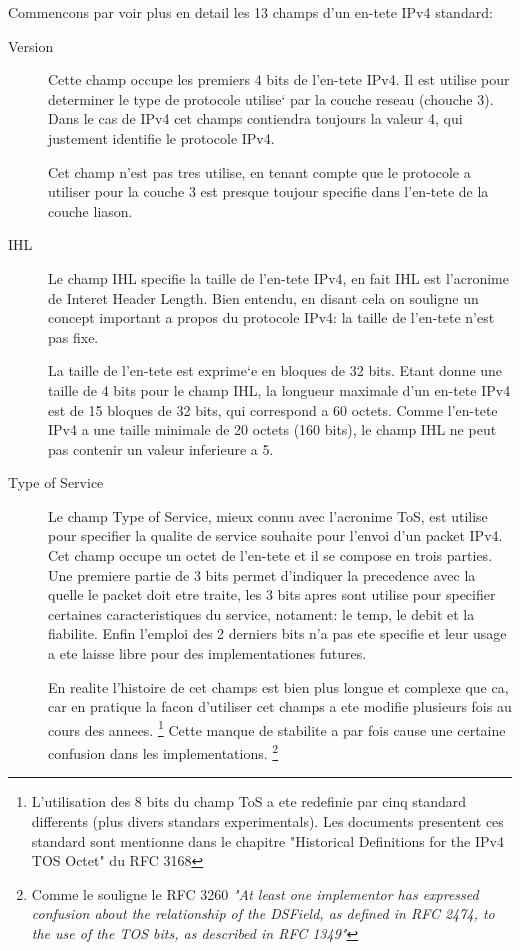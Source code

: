 \documentclass[twoside,openright,a4paper,11pt,french]{article}
\begin{document}
Commencons par voir plus en detail les 13 champs d'un en-tete IPv4 standard:

\begin{description}
\item [Version] 
Cette champ occupe les premiers 4 bits de l'en-tete IPv4. Il est
utilise pour determiner le type de protocole utilise` par la couche
reseau (chouche 3). Dans le cas de IPv4 cet champs contiendra toujours
la valeur 4, qui justement identifie le protocole IPv4.

Cet champ n'est pas tres utilise, en tenant compte que le protocole 
a utiliser pour la couche 3 est presque toujour specifie dans l'en-tete
de la couche liason.

\item [IHL]
Le champ IHL specifie la taille de l'en-tete IPv4, en fait IHL est 
l'acronime de Interet Header Length. Bien entendu, en disant cela on souligne
un concept important a propos du protocole IPv4: la taille de l'en-tete n'est pas fixe.

La taille de l'en-tete est exprime`e en bloques de 32 bits. Etant donne une taille de
4 bits pour le champ IHL, la longueur maximale d'un en-tete IPv4 est de 15 bloques de
32 bits, qui correspond a 60 octets. Comme l'en-tete IPv4 a une taille minimale
de 20 octets (160 bits), le champ IHL ne peut pas contenir un valeur inferieure a 5.

\item [Type of Service]
Le champ Type of Service, mieux connu avec l'acronime ToS, est utilise pour 
specifier la qualite de service souhaite pour l'envoi d'un packet IPv4.
Cet champ occupe un octet de l'en-tete et il se compose en trois parties.
Une premiere partie de 3 bits permet d'indiquer la precedence avec la quelle
le packet doit etre traite, les 3 bits apres sont utilise pour specifier 
certaines caracteristiques du service, notament: le temp, le debit et la fiabilite.
Enfin l'emploi des 2 derniers bits n'a pas ete specifie et leur usage a ete 
laisse libre pour des implementationes futures.


En realite l'histoire de cet champs est bien plus longue et complexe que ca,
car en pratique la facon d'utiliser cet champs a ete modifie plusieurs fois au 
cours des annees.
\footnote{L'utilisation des 8 bits du champ ToS a ete redefinie
par cinq standard differents (plus divers standars experimentals).
Les documents presentent ces standard sont mentionne dans le chapitre 
"Historical Definitions for the IPv4 TOS Octet" du RFC 3168}
Cette manque de stabilite a par fois cause une certaine confusion dans les implementations.
\footnote{Comme le souligne le RFC 3260 {\it "At least one implementor has expressed confusion about the
relationship of the DSField, as defined in RFC 2474, to the use of
the TOS bits, as described in RFC 1349"}}


\end{description}
\end{document}
